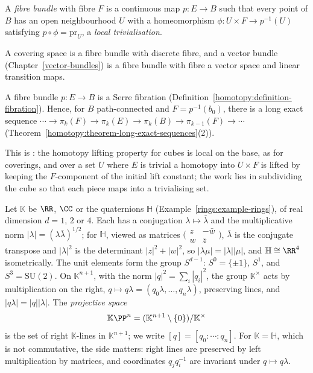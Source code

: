 \begin{definition}\label{topological-manifolds:definition-fibre-bundle}
A \emph{fibre bundle} with fibre $F$ is a continuous map $p \colon E \to B$ such that every point of $B$ has an open neighbourhood $U$ with a homeomorphism $\phi \colon U \times F \to p^{-1}(U)$ satisfying
$p \circ \phi = \mathrm{pr}_U$, a \emph{local trivialisation}.
\end{definition}

A covering space is a fibre bundle with discrete fibre, and a vector bundle (Chapter~\ref{vector-bundles}) is a fibre bundle with fibre a vector space and linear transition maps.

\begin{theorem}\label{topological-manifolds:theorem-bundles-fibrations}
A fibre bundle $p \colon E \to B$ is a Serre fibration (Definition~\ref{homotopy:definition-fibration}). Hence, for $B$ path-connected and $F = p^{-1}(b_0)$, there is a long exact sequence
$\cdots \to \pi_k(F) \to \pi_k(E) \to \pi_k(B) \to \pi_{k-1}(F) \to \cdots$ (Theorem~\ref{homotopy:theorem-long-exact-sequences}(2)).
\end{theorem}

This is \cite[Proposition 4.48]{hatcher-at}: the homotopy lifting property for cubes is local on the base, as for coverings, and over a set $U$ where $E$ is trivial a homotopy into $U \times F$ is lifted by
keeping the $F$-component of the initial lift constant; the work lies in subdividing the cube so that each piece maps into a trivialising set.

Let $\mathbb{K}$ be $\RR$, $\CC$ or the quaternions $\mathbb{H}$ (Example~\ref{rings:example-rings}), of real dimension $d = 1$, $2$ or $4$. Each has a conjugation $\lambda \mapsto \bar\lambda$ and the multiplicative norm
$|\lambda| = (\lambda\bar\lambda)^{1/2}$; for $\mathbb{H}$, viewed as matrices $\bigl(\begin{smallmatrix} z & -\bar w\\ w & \bar z\end{smallmatrix}\bigr)$, $\bar\lambda$ is the conjugate transpose and $|\lambda|^2$ is the determinant $|z|^2 + |w|^2$, so
$|\lambda\mu| = |\lambda||\mu|$, and $\mathbb{H} \cong \RR^4$ isometrically. The unit elements form the group $S^{d-1}$: $S^0 = \{\pm1\}$, $S^1$, and $S^3 = \mathrm{SU}(2)$. On $\mathbb{K}^{n+1}$, with the norm
$|q|^2 = \sum_i|q_i|^2$, the group $\mathbb{K}^\times$ acts by multiplication on the right, $q \mapsto q\lambda = (q_0\lambda, \ldots, q_n\lambda)$, preserving lines, and $|q\lambda| = |q||\lambda|$. The \emph{projective space}
\[
\mathbb{K}\PP^n = (\mathbb{K}^{n+1} \setminus \{0\})/\mathbb{K}^\times
\]
is the set of right $\mathbb{K}$-lines in $\mathbb{K}^{n+1}$; we write $[q] = [q_0 : \cdots : q_n]$. For $\mathbb{K} = \mathbb{H}$, which is not commutative, the side matters: right lines are preserved by left
multiplication by matrices, and coordinates $q_jq_i^{-1}$ are invariant under $q \mapsto q\lambda$.


